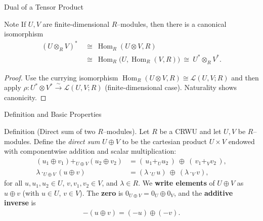 \begin{frame}{Dual of a Tensor Product}
\begin{block}{Note}
If $U,V$ are finite-dimensional $R$–modules, then there is a canonical isomorphism
\begin{align*}
    (U\otimes_R V)^*\ &\cong\ \operatorname{Hom}_R(U\otimes V,R)\\\ &\cong\ \operatorname{Hom}_R\!\big(U,\operatorname{Hom}_R(V,R)\big)
\ \cong\ U^*\otimes_R V^*.
\end{align*}

\end{block}
\begin{proof}
Use the currying isomorphism $\operatorname{Hom}_R(U\otimes V,R)\cong \mathcal{L}(U,V;R)$ and then apply $\rho: U^*\otimes V^* \xrightarrow{\sim} \mathcal{L}(U,V;R)$ (finite-dimensional case). Naturality shows canonicity.
\end{proof}
\end{frame}


\begin{frame}{Definition and Basic Properties}
\begin{block}{Definition (Direct sum of two $R$–modules).}
Let $R$ be a CRWU and let $U,V$ be $R$–modules.
Define the \emph{direct sum} $U\oplus V$ to be the cartesian product $U\times V$ endowed with componentwise addition and scalar multiplication:
\begin{align*}
(u_1\oplus v_1) +_{U\oplus V} (u_2\oplus v_2) &= (\,u_1 +_{U} u_2\,)\ \oplus\ (\,v_1 +_{V} v_2\,),\\
\lambda\cdot_{U\oplus V} (u\oplus v) &= (\lambda\cdot_U u)\ \oplus\ (\lambda\cdot_V v),
\end{align*}
for all $u,u_1,u_2\in U$, $v,v_1,v_2\in V$, and $\lambda\in R$.
We \textbf{write elements} of $U\oplus V$ as $u\oplus v$ (with $u\in U$, $v\in V$).
The \textbf{zero} is $0_{U\oplus V}=0_U\oplus 0_V$, and the \textbf{additive inverse} is
\begin{align*}
-(u\oplus v)=(-u)\oplus(-v).
\end{align*}
\end{block}
\end{frame}

